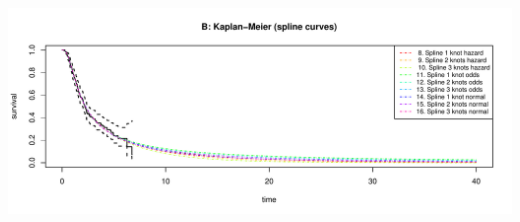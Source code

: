 \documentclass[
]{article}
\begin{document}
\begin{flushleft}\includegraphics[height=0.29\textheight]{Images/validate_extrapolation3-2} \end{flushleft}

\begin{table}


\end{table}
\end{document}
